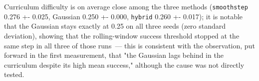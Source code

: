 Curriculum difficulty is on average close among the three methods (\texttt{smoothstep} 0.276 +- 0.025, Gaussian 0.250 +- 0.000, \texttt{hybrid} 0.260 +- 0.017); it is notable that the Gaussian stays exactly at 0.25 on all three seeds (zero standard deviation), showing that the rolling-window success threshold stopped at the same step in all three of those runs~--- this is consistent with the observation, put forward in the first measurement, that "the Gaussian lags behind in the curriculum despite its high mean success," although the cause was not directly tested.
